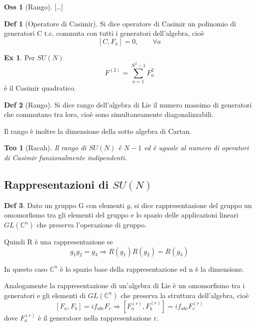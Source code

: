 \documentclass[10pt,a4paper]{article}
\newtheorem{thm}{Teo}[section]
\theoremstyle{definition}
\newtheorem{definition}{Def}[section]
\newtheorem{observation}{Oss}[section]
\newtheorem{example}{Ex}[section]
\begin{document}
\begin{observation}[Rango]
    [\dots]
\end{observation}

\begin{definition}[Operatore di Casimir]
    Si dice operatore di Casimir un polinomio di generatori C t.c. commuta con tutti i generatori dell'algebra, cioè
    \[
    [C, F_a] = 0, \qquad \forall a     
    \]
\end{definition}

\begin{example}
    Per $SU(N)$
    \[
    F^{(2)} = \sum_{a = 1}^{N^2 - 1}F_a^2    
    \]
    è il Casimir quadratico.
\end{example}

\begin{definition}[Rango]
    Si dice rango dell'algebra di Lie il numero massimo di generatori che commutano tra loro, cioè sono simultaneamente diagonalizzabili.
\end{definition}

Il rango è inoltre la dimensione della sotto algebra di Cartan.

\begin{thm}[Racah]
    Il rango di $SU(N)$ è $N - 1$ ed è uguale al numero di operatori di Casimir funzionalmente indipendenti.
\end{thm}

\subsection{Rappresentazioni di $SU(N)$}

\begin{definition}
    Dato un gruppo G con elementi $g$, si dice rappresentazione del gruppo un omomorfismo tra gli elementi del gruppo e lo spazio delle applicazioni lineari $GL(\mathbb{C}^n)$ che preserva l'operazione di gruppo.
    
    Quindi R è una rappresentazione se 
    \[
    g_1 g_2 = g_3 \Rightarrow R(g_1) R(g_2) = R(g_3)    
    \]
\end{definition}
In questo caso $\mathbb{C}^n$ è lo spazio base della rappresentazione ed n è la dimensione.

Analogamente la rappresentazione di un'algebra di Lie è un omomorfismo tra i generatori e gli elementi di $GL(\mathbb{C}^n)$ che preserva la struttura dell'algebra, cioè
\[
[F_a, F_b] = i f_{abc}F_c \Rightarrow [F_a^{(r)}, F_b^{(r)}] = if_{abc}F_c^{(r)}    
\]
dove $F_a^{(r)}$ è il generatore nella rappresentazione r.
\end{document}
